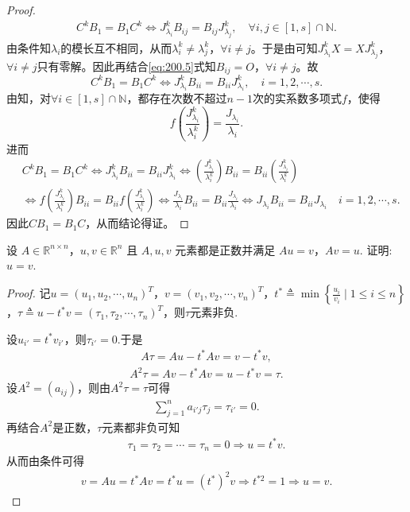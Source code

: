\documentclass[../../main.tex]{subfiles}
\begin{document}
\begin{proof}
\begin{align}
C^k B_1 = B_1 C^k \Longleftrightarrow J_{\lambda_i}^k B_{ij} = B_{ij} J_{\lambda_j}^k, \quad \forall i,j \in [1,s] \cap \mathbb{N}.
\label{eq:200.5}
\end{align}
由条件知$\lambda_i$的模长互不相同，从而$\lambda_i^k \ne \lambda_j^k$，$\forall i \ne j$。于是由可知$J_{\lambda_i}^k X = X J_{\lambda_j}^k$，$\forall i \ne j$只有零解。因此再结合\eqref{eq:200.5}式知$B_{ij} = O$，$\forall i \ne j$。故
\[
C^k B_1 = B_1 C^k \Longleftrightarrow J_{\lambda_i}^k B_{ii} = B_{ii} J_{\lambda_i}^k, \quad i = 1,2,\cdots,s.
\]
由知，对$\forall i \in [1,s] \cap \mathbb{N}$，都存在次数不超过$n - 1$次的实系数多项式$f$，使得
\[
f\left( \frac{J_{\lambda_i}^k}{\lambda_i^k} \right) = \frac{J_{\lambda_i}}{\lambda_i}.
\]
进而
\begin{align*}
&C^k B_1 = B_1 C^k \Longleftrightarrow J_{\lambda_i}^k B_{ii} = B_{ii} J_{\lambda_i}^k \Longleftrightarrow \left( \frac{J_{\lambda_i}^k}{\lambda_i^k} \right) B_{ii} = B_{ii} \left( \frac{J_{\lambda_i}^k}{\lambda_i^k} \right)
\\
&\Longleftrightarrow f\left( \frac{J_{\lambda_i}^k}{\lambda_i^k} \right) B_{ii} = B_{ii} f\left( \frac{J_{\lambda_i}^k}{\lambda_i^k} \right) 
\Longleftrightarrow \frac{J_{\lambda_i}}{\lambda_i} B_{ii} = B_{ii} \frac{J_{\lambda_i}}{\lambda_i} \Longleftrightarrow J_{\lambda_i} B_{ii} = B_{ii} J_{\lambda_i} \quad i = 1,2,\cdots,s.
\end{align*}
因此$C B_1 = B_1 C$，从而结论得证。

\end{proof}

\begin{example}
设 \( A \in \mathbb{R}^{n \times n} \)，\( u, v \in \mathbb{R}^n \) 且 \( A, u, v \) 元素都是正数并满足 \( Au = v \)，\( Av = u \). 证明: \( u = v \).
\end{example}
\begin{proof}
记$u=(u_1,u_2,\cdots,u_n)^T$，$v=(v_1,v_2,\cdots,v_n)^T$，$t^*\triangleq\min\left\{\frac{u_i}{v_i}\mid 1\leqslant i\leqslant n\right\}$，$\tau\triangleq u-t^*v=(\tau_1,\tau_2,\cdots,\tau_n)^T$，则$\tau$元素非负.

设$u_{i'}=t^*v_{i'}$，则$\tau_{i'}=0$.于是
\begin{align*}
A\tau=Au-t^*Av=v-t^*v,
\end{align*}
\begin{align*}
A^2\tau=Av-t^*Av=u-t^*v=\tau.
\end{align*}
设$A^2=(a_{ij})$，则由$A^2\tau=\tau$可得
\begin{align*}
\sum_{j=1}^n a_{i'j}\tau_j=\tau_{i'}=0.
\end{align*}
再结合$A^2$是正数，$\tau$元素都非负可知
\begin{align*}
\tau_1=\tau_2=\cdots=\tau_n=0\Longrightarrow u=t^*v.
\end{align*}
从而由条件可得
\begin{align*}
v=Au=t^*Av=t^*u=(t^*)^2v\Longrightarrow t^{*2}=1\Longrightarrow u=v.
\end{align*}

\end{proof}
\end{document}
